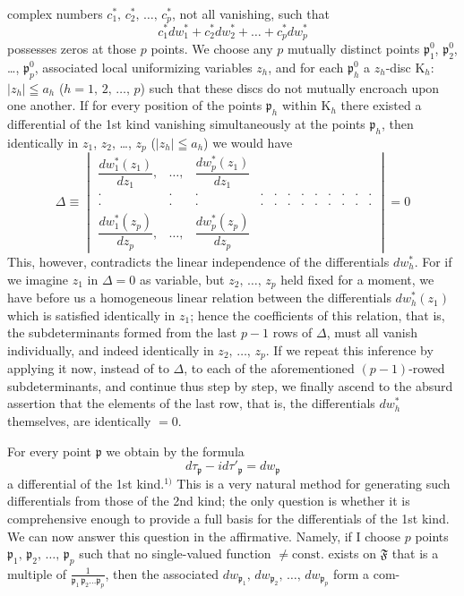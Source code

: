 \documentclass{article}
\begin{document}
complex numbers $c_1^*, \, c_2^*, \, \dots, \, c_p^*$, not all vanishing, such that
\[ c_1^* dw_1^* + c_2^* dw_2^* + \dots + c_p^* dw_p^* \]
possesses zeros at those $p$ points. We choose any $p$ mutually distinct points $\mathfrak{p}_1^0$, $\mathfrak{p}_2^0$, \dots, $\mathfrak{p}_p^0$, associated local uniformizing variables $z_h$, and for each $\mathfrak{p}_h^0$ a $z_h$-disc $\mathrm{K}_h$: $|z_h| \leqq a_h$ ($h = 1, \, 2, \, \dots, \, p$) such that these discs do not mutually encroach upon one another. If for every position of the points $\mathfrak{p}_h$ within $\mathrm{K}_h$ there existed a differential of the 1st kind vanishing simultaneously at the points $\mathfrak{p}_h$, then identically in $z_1$, $z_2$, \dots, $z_p$ ($|z_h| \leqq a_h$) we would have
\[ \Delta \equiv \begin{vmatrix}
\dfrac{dw_1^*(z_1)}{dz_1}, & \dots, & \dfrac{dw_p^*(z_1)}{dz_1} \\
\cdot & \cdot & \cdot & \cdot & \cdot & \cdot & \cdot & \cdot & \cdot & \cdot & \cdot & \cdot \\
\cdot & \cdot & \cdot & \cdot & \cdot & \cdot & \cdot & \cdot & \cdot & \cdot & \cdot & \cdot \\
\dfrac{dw_1^*(z_p)}{dz_p}, & \dots, & \dfrac{dw_p^*(z_p)}{dz_p}
\end{vmatrix} = 0 \]
This, however, contradicts the linear independence of the differentials $dw_h^*$. For if we imagine $z_1$ in $\Delta = 0$ as variable, but $z_2, \, \dots, \, z_p$ held fixed for a moment, we have before us a homogeneous linear relation between the differentials $dw_h^*(z_1)$ which is satisfied identically in $z_1$; hence the coefficients of this relation, that is, the subdeterminants formed from the last $p - 1$ rows of $\Delta$, must all vanish individually, and indeed identically in $z_2, \, \dots, \, z_p$. If we repeat this inference by applying it now, instead of to $\Delta$, to each of the aforementioned $(p - 1)$-rowed subdeterminants, and continue thus step by step, we finally ascend to the absurd assertion that the elements of the last row, that is, the differentials $dw_h^*$ themselves, are identically $= 0$.

For every point $\mathfrak{p}$ we obtain by the formula
\[ d\tau_{\mathfrak{p}} - i d\tau'_{\mathfrak{p}} = dw_{\mathfrak{p}} \]
a differential of the 1st kind.${}^{1)}$ This is a very natural method for generating such differentials from those of the 2nd kind; the only question is whether it is comprehensive enough to provide a full basis for the differentials of the 1st kind. We can now answer this question in the affirmative. Namely, if I choose $p$ points $\mathfrak{p}_1, \, \mathfrak{p}_2, \, \dots, \, \mathfrak{p}_p$ such that no single-valued function $\neq \mathrm{const.}$ exists on $\mathfrak{F}$ that is a multiple of $\frac{1}{\mathfrak{p}_1 \, \mathfrak{p}_2 \dots \mathfrak{p}_p}$, then the associated $dw_{\mathfrak{p}_1}, \, dw_{\mathfrak{p}_2}, \, \dots, \, dw_{\mathfrak{p}_p}$ form a com-
\end{document}
